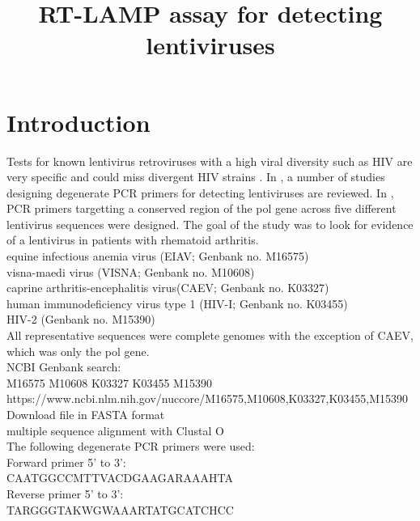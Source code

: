 \documentclass{article}
\title{RT-LAMP assay for detecting lentiviruses}
\begin{document}
\maketitle

\section{Introduction}

Tests for known lentivirus retroviruses with a high viral diversity such as HIV are very specific and could miss divergent HIV strains \cite{bartolo2012hiv}\cite{luft2011hiv}. In \cite{voisset2008human}, a number of studies designing degenerate PCR primers for detecting lentiviruses are reviewed. In \cite{giovine1994absence}, PCR primers targetting a conserved region of the pol gene across five different lentivirus sequences were designed. The goal of the study was to look for evidence of a lentivirus in patients with rhematoid arthritis. \\

\noindent
equine infectious anemia virus (EIAV; Genbank no. M16575) \\
visna-maedi virus (VISNA; Genbank no. M10608) \\
caprine arthritis-encephalitis virus(CAEV; Genbank no. K03327) \\
human immunodeficiency virus type 1 (HIV-I; Genbank no. K03455) \\
HIV-2 (Genbank no. M15390) \\

\noindent
All representative sequences were complete genomes with the exception of CAEV, which was only the pol gene.\\

\noindent
NCBI Genbank search:\\
M16575 M10608 K03327 K03455 M15390\\
https://www.ncbi.nlm.nih.gov/nuccore/M16575,M10608,K03327,K03455,M15390\\
Download file in FASTA format\\
multiple sequence alignment with Clustal O\\


\noindent
The following degenerate PCR primers were used:\\
Forward primer 5' to 3':\\
CAATGGCCMTTVACDGAAGARAAAHTA\\
Reverse primer 5' to 3':\\
TARGGGTAKWGWAAARTATGCATCHCC\\
\end{document}
